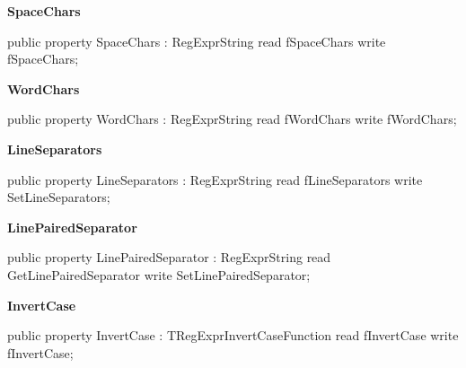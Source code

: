 \documentclass{report}
\newif\ifpdf
\begin{document}
\begin{list}{}
\begin{flushleft}
\ifpdf
\end{flushleft}
\fi


\par  \label{RegExpr.TRegExpr-SpaceChars}
\item[\textbf{SpaceChars}\hfill]
\ifpdf
\begin{flushleft}
\fi
\begin{ttfamily}
public property SpaceChars : RegExprString read fSpaceChars write fSpaceChars;\end{ttfamily}

\ifpdf
\end{flushleft}
\fi


\par  \label{RegExpr.TRegExpr-WordChars}
\item[\textbf{WordChars}\hfill]
\ifpdf
\begin{flushleft}
\fi
\begin{ttfamily}
public property WordChars : RegExprString read fWordChars write fWordChars;\end{ttfamily}

\ifpdf
\end{flushleft}
\fi


\par  \label{RegExpr.TRegExpr-LineSeparators}
\item[\textbf{LineSeparators}\hfill]
\ifpdf
\begin{flushleft}
\fi
\begin{ttfamily}
public property LineSeparators : RegExprString read fLineSeparators write SetLineSeparators;\end{ttfamily}

\ifpdf
\end{flushleft}
\fi


\par  \label{RegExpr.TRegExpr-LinePairedSeparator}
\item[\textbf{LinePairedSeparator}\hfill]
\ifpdf
\begin{flushleft}
\fi
\begin{ttfamily}
public property LinePairedSeparator : RegExprString read GetLinePairedSeparator write SetLinePairedSeparator;\end{ttfamily}

\ifpdf
\end{flushleft}
\fi


\par  \label{RegExpr.TRegExpr-InvertCase}
\item[\textbf{InvertCase}\hfill]
\ifpdf
\begin{flushleft}
\fi
\begin{ttfamily}
public property InvertCase : TRegExprInvertCaseFunction read fInvertCase write fInvertCase;\end{ttfamily}

\ifpdf
\end{flushleft}
\fi


\par  \end{list}
\end{document}
